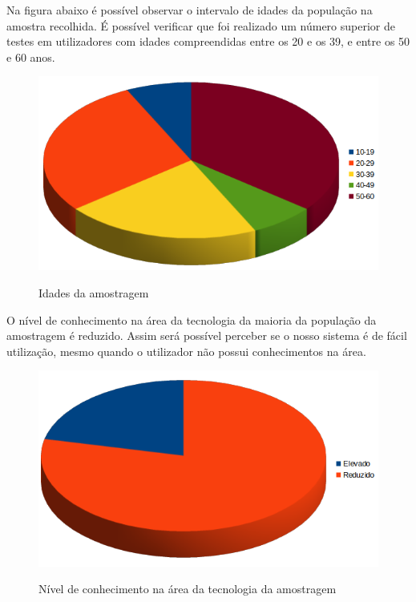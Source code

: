 \documentclass[11pt, a4paper]{article}
\begin{document}
Na figura abaixo é possível observar o intervalo de idades da população na amostra recolhida. É possível verificar que foi realizado um número superior de testes em utilizadores com idades compreendidas entre os 20 e os 39, e entre os 50 e 60 anos. 

\begin{figure}[H]
    \centering
    \includegraphics[scale=0.5]{images/idades.png}
    \label{figIdades}
    \caption{Idades da amostragem}
\end{figure}

O nível de conhecimento na área da tecnologia da maioria da população da amostragem é reduzido.
Assim será possível perceber se o nosso sistema é de fácil utilização, mesmo quando o utilizador não possui conhecimentos na área.
\begin{figure}[H]
    \centering
    \includegraphics[scale=0.5]{images/conhecimento.png}
    \label{figConhecimentos}
    \caption{Nível de conhecimento na área da tecnologia da amostragem}
\end{figure}
\end{document}
